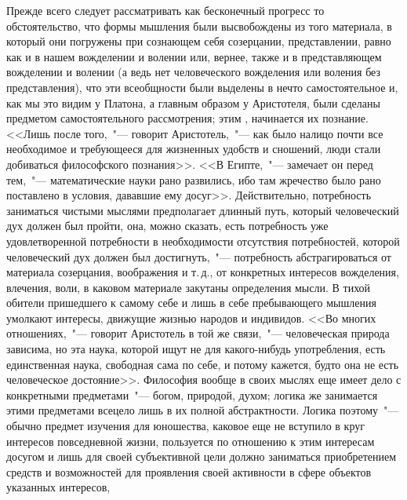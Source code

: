 
Прежде всего следует рассматривать как бесконечный
прогресс то обстоятельство, что формы мышления были
высвобождены из того материала, в который они погружены
при сознающем себя созерцании, представлении,
равно как и в нашем вожделении и волении или, вернее,
также и в представляющем вожделении и волении (а ведь
нет человеческого вожделения или воления без представления),
что эти всеобщности были выделены в нечто самостоятельное
и, как мы это видим у Платона, а главным
образом у Аристотеля, были сделаны предметом самостоятельного
рассмотрения; этим , начинается их познание.
<<Лишь после того,~"--- говорит Аристотель,~"--- как было налицо
почти все необходимое и требующееся для жизненных
удобств и сношений, люди стали добиваться философского
познания>>. <<В Египте,~"--- замечает он перед
тем,~"--- математические науки рано развились, ибо там
жречество было рано поставлено в условия, дававшие
ему досуг>>.
Действительно, потребность заниматься чистыми
мыслями предполагает длинный путь, который
человеческий дух должен был пройти, она, можно сказать,
есть потребность уже удовлетворенной потребности
в необходимости отсутствия потребностей, которой человеческий
дух должен был достигнуть,~"--- потребность абстрагироваться
от материала созерцания, воображения
и т.\,д., от конкретных интересов вожделения, влечения,
воли, в каковом материале закутаны определения мысли.
В тихой обители пришедшего к самому себе и лишь в себе
пребывающего мышления умолкают интересы, движущие
жизнью народов и индивидов. <<Во многих отношениях,~"---
говорит Аристотель в той же связи,~"--- человеческая природа
зависима, но эта наука, которой ищут не для какого-нибудь
употребления, есть единственная наука, свободная
сама по себе, и потому кажется, будто она не есть человеческое
достояние>>\endnotemark{}. Философия вообще в своих мыслях
еще имеет дело с конкретными предметами~"--- богом, природой,
духом; логика же занимается этими предметами
всецело лишь в их полной абстрактности. Логика поэтому~"---
обычно предмет изучения для юношества, каковое
еще не вступило в круг интересов повседневной жизни,
пользуется по отношению к этим интересам досугом и
лишь для своей субъективной цели должно заниматься
приобретением средств и возможностей для проявления
своей активности в сфере объектов указанных интересов,
